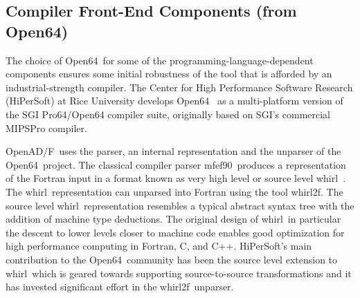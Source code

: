 \documentclass{book}
\newcommand{\mfefninety}{mfef90}
\newcommand{\OpenADF}{OpenAD/F}
\newcommand{\OpenSixtyFour}{Open64}
\newcommand{\whirl}{whirl}
\newcommand{\whirlTof}{whirl2f}
\begin{document}
\subsection{Compiler Front-End Components (from \OpenSixtyFour)} \label{sssec:mfef}

The choice of \OpenSixtyFour\ for some of the programming-language-dependent 
components ensures some initial robustness of the tool that is afforded by an 
industrial-strength compiler. 
The Center for High Performance Software Research (HiPerSoft) at Rice University 
develops \OpenSixtyFour\ \cite{open64Web} as a 
multi-platform version of the SGI Pro64/Open64 compiler
suite, originally based on SGI's commercial MIPSPro compiler.

\OpenADF\ uses the parser, an internal representation and the unparser 
of the \OpenSixtyFour\ project.
The classical compiler parser \mfefninety\ produces a representation of the Fortran 
input in a format known as very high level or source level \whirl\ . 
The \whirl\ representation can unparsed into Fortran using the 
tool \whirlTof.
The source level \whirl\
representation resembles a typical abstract syntax tree with the 
addition of machine type deductions. 
The original design of \whirl\ in particular the descent to 
lower levels closer to machine code  enables good optimization 
for high performance
computing in Fortran, C, and C++. HiPerSoft's main
contribution to the \OpenSixtyFour\ community has been the source 
level extension to \whirl\
which is geared towards supporting source-to-source transformations and 
it 
has invested significant effort in the \whirlTof\ unparser.
\end{document}
